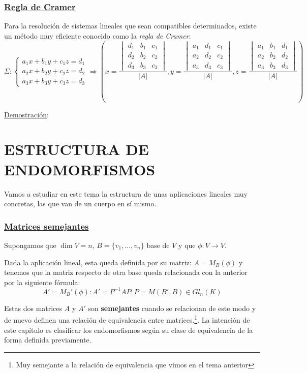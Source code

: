 \documentclass[10pt,a4paper,openright]{book}
\begin{document}
\subsection*{\underline{Regla de Cramer}}
Para la resolución de sistemas lineales que sean compatibles determinados, existe un método muy eficiente conocido como la \textit{regla de Cramer}:
$$\Sigma:\begin{cases}a_1x+b_1y+c_1z=d_1 \\ a_2x+b_2y+c_2z=d_2 \\ a_3x+b_3y+c_3z=d_3 \end{cases}\Rightarrow \left( x=\frac{\begin{vmatrix} d_1 & b_1 & c_1 \\ d_2 & b_2 & c_2 \\ d_3 & b_3 & c_3 \end{vmatrix}}{|A|}, y=\frac{\begin{vmatrix} a_1 & d_1 & c_1 \\ a_2 & d_2 & c_2 \\ a_3 & d_3 & c_3 \end{vmatrix}}{|A|}, z=\frac{\begin{vmatrix} a_1 & b_1 & d_1 \\ a_2 & b_2 & d_2 \\ a_3 & b_3 & d_3 \end{vmatrix}}{|A|} \right)$$

\underline{Demostración}:

\chapter*{ESTRUCTURA DE \\ ENDOMORFISMOS}
Vamos a estudiar en este tema la estructura de unas aplicaciones lineales muy concretas, las que van de un cuerpo en sí mismo.

\subsection*{\underline{Matrices semejantes}}
Supongamos que $\dim V = n$, $B=\{v_1, ..., v_n\}$ base de $V$ y que $\phi: V\rightarrow V$.

Dada la aplicación lineal, esta queda definida por su matriz: $A=M_B(\phi)$ y tenemos que la matriz respecto de otra base queda relacionada con la anterior por la siguiente fórmula:
$$A'=M_B'(\phi): A'= P^{-1}AP: P=M(B',B)\in Gl_n(K)$$

Estas dos matrices $A$ y $A'$ son \textbf{semejantes} cuando se relacionan de este modo y de nuevo definen una relación de equivalencia entre matrices.\footnote{Muy semejante a la relación de equivalencia que vimos en el tema anterior}. La intención de este capítulo es clasificar los endomorfismos según su clase de equivalencia de la forma definida previamente.
\end{document}
